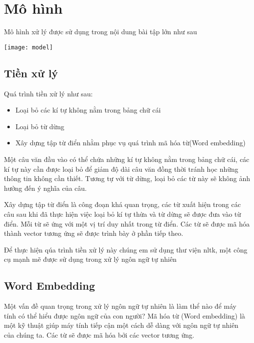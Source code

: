 \chapter{Mô hình}
\ifpdf
    \graphicspath{{Chapter2/Chapter2Figs/PNG/}{Chapter2/Chapter2Figs/PDF/}{Chapter2/Chapter2Figs/}}
\else
    \graphicspath{{Chapter2/Chapter2Figs/EPS/}{Chapter2/Chapter2Figs/}}
\fi
Mô hình xử lý được sử dụng trong nội dung bài tập lớn như sau
	\begin{center}
	  \texttt{[image: model]}
	  \label{model}
	\end{center} 
\section{Tiền xử lý}
Quá trình tiền xử lý như sau:
	\begin{itemize}[label = \textbullet]
		\item Loại bỏ các kí tự không nằm trong bảng chữ cái
		\item Loại bỏ từ dừng
		\item Xây dựng tập từ điển nhằm phục vụ quá trình mã hóa từ(Word embedding)
	\end{itemize}
Một câu văn đầu vào có thể chứa những kí tự không nằm trong bảng chữ cái, các kí tự này cần được loại bỏ để giảm độ dài câu văn đồng thời tránh học những thông tin không cần thiết. Tương tự với từ dừng, loại bỏ các từ này sẽ không ảnh hưởng đến ý nghĩa của câu. 

Xây dựng tập từ điển là công đoạn khá quan trọng, các từ xuất hiện trong các câu sau khi đã thực hiện việc loại bỏ kí tự thừa và từ dừng sẽ được đưa vào từ điển. Mỗi từ sẽ ứng với một vị trí duy nhất trong từ điển. Các từ sẽ được mã hóa thành vector tương ứng sẽ được trình bày ở phần tiếp theo. 

Để thực hiện qúa trình tiền xử lý này chúng em sử dụng thư viện nltk, một công cụ mạnh mẽ được sử dụng trong xử lý ngôn ngữ tự nhiên

\section{Word Embedding}
Một vấn đề quan trọng trong xử lý ngôn ngữ tự nhiên là làm thể nào để máy tính có thể hiểu được ngôn ngữ của con người? Mã hóa từ (Word embedding) là một kỹ thuật giúp máy tính tiếp cận một cách dễ dàng với ngôn ngữ tự nhiên của chúng ta. Các từ sẽ được mã hóa bởi các vector tương ứng.

